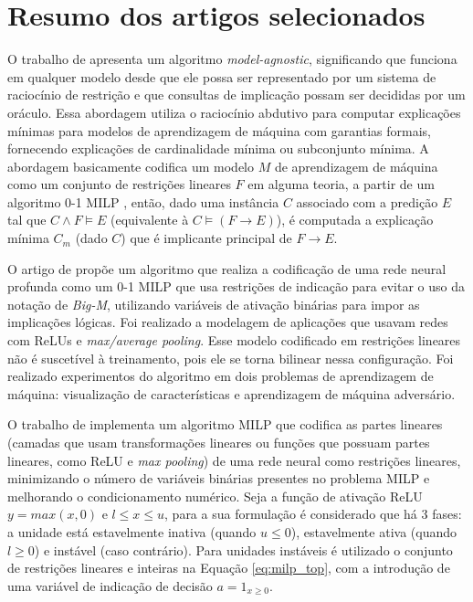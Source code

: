 \section{Resumo dos artigos selecionados}

O trabalho de  apresenta um algoritmo \textit{model-agnostic}, significando que funciona em qualquer modelo desde que ele possa ser representado por um sistema de raciocínio de restrição e que consultas de implicação possam ser decididas por um oráculo. Essa abordagem utiliza o raciocínio abdutivo para computar explicações mínimas para modelos de aprendizagem de máquina com garantias formais, fornecendo explicações de cardinalidade mínima ou subconjunto mínima. A abordagem basicamente codifica um modelo $M$ de aprendizagem de máquina como um conjunto de restrições lineares $F$ em alguma teoria, a partir de um algoritmo 0-1 MILP \cite{milp_01}, então, dado uma instância $C$ associado com a predição $E$ tal que $C \wedge F \models E$ (equivalente à $C \models (F \rightarrow E)$), é computada a explicação mínima $C_m$ (dado $C$) que é implicante principal de  $F \rightarrow E$. 

O artigo de  propõe um algoritmo que realiza a codificação de uma rede neural profunda como um 0-1 MILP que usa restrições de indicação para evitar o uso da notação de \textit{Big-M}, utilizando variáveis de ativação binárias para impor as implicações lógicas. Foi realizado a modelagem de aplicações que usavam redes com ReLUs e \textit{max/average pooling}. Esse modelo codificado em restrições lineares não é suscetível à treinamento, pois ele se torna bilinear nessa configuração. Foi realizado experimentos do algoritmo em dois problemas de aprendizagem de máquina: visualização de características e aprendizagem de máquina adversário.

O trabalho de  implementa um algoritmo MILP que codifica as partes lineares (camadas que usam transformações lineares ou funções que possuam partes lineares, como ReLU e \textit{max pooling}) de uma rede neural como restrições lineares, minimizando o número de variáveis binárias presentes no problema MILP e melhorando o condicionamento numérico. Seja a função de ativação ReLU $y = max(x, 0)$ e $l \leq x \leq u$, para a sua formulação é considerado que há 3 fases: a unidade está estavelmente inativa (quando $u \leq 0$), estavelmente ativa (quando $l \geq 0$) e instável (caso contrário). Para unidades instáveis é utilizado o conjunto de restrições lineares e inteiras na Equação \ref{eq:milp_top}, com a introdução de uma variável de indicação de decisão $a = 1_{x \geq 0}$.

